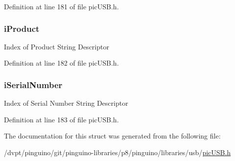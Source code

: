 Definition at line 181 of file pic\-U\-S\-B.\-h.

\hypertarget{struct_u_s_b___device___descriptor_a038aa24fddd7b42b20976e13392954f2}{
\subsubsection[{i\-Product}]{ i\-Product}}\label{struct_u_s_b___device___descriptor_a038aa24fddd7b42b20976e13392954f2}
Index of Product String Descriptor 

Definition at line 182 of file pic\-U\-S\-B.\-h.

\hypertarget{struct_u_s_b___device___descriptor_ad5cf25949929f3baddc6f1b2751835dc}{
\subsubsection[{i\-Serial\-Number}]{ i\-Serial\-Number}}\label{struct_u_s_b___device___descriptor_ad5cf25949929f3baddc6f1b2751835dc}
Index of Serial Number String Descriptor 

Definition at line 183 of file pic\-U\-S\-B.\-h.



The documentation for this struct was generated from the following file\-:\begin{DoxyCompactItemize}
\item 
/dvpt/pinguino/git/pinguino-\/libraries/p8/pinguino/libraries/usb/\hyperlink{pic_u_s_b_8h}{pic\-U\-S\-B.\-h}\end{DoxyCompactItemize}
